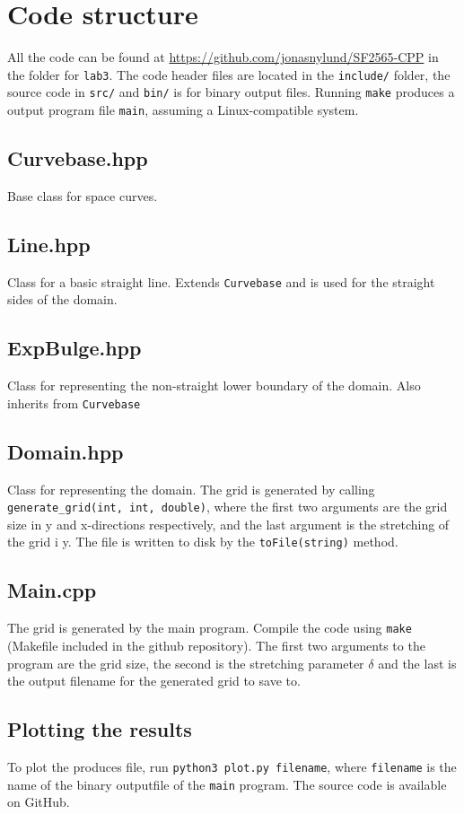 \documentclass[12pt]{article}
\begin{document}
\section{Code structure}
All the code can be found at \href{https://github.com/jonasnylund/SF2565-CPP}{https://github.com/jonasnylund/SF2565-CPP} in the folder for \texttt{lab3}. The code header files are located in the \texttt{include/} folder, the source code in \texttt{src/} and \texttt{bin/} is for binary output files. Running \texttt{make} produces a output program file \texttt{main}, assuming a Linux-compatible system.

\subsection*{Curvebase.hpp}
Base class for space curves.



\subsection*{Line.hpp}
Class for a basic straight line. Extends \texttt{Curvebase} and is used for the straight sides of the domain.



\subsection*{ExpBulge.hpp}
Class for representing the non-straight lower boundary of the domain. Also inherits from \texttt{Curvebase}


\subsection*{Domain.hpp}
Class for representing the domain. The grid is generated by calling \texttt{generate\_grid(int, int, double)}, where the first two arguments are the grid size in y and x-directions respectively, and the last argument is the stretching of the grid i y. The file is written to disk by the \texttt{toFile(string)} method.


\subsection*{Main.cpp}
The grid is generated by the main program. Compile the code using \texttt{make} (Makefile included in the github repository). The first two arguments to the program are the grid size, the second is the stretching parameter $\delta$ and the last is the output filename for the generated grid to save to. 



\subsection*{Plotting the results}
To plot the produces file, run \texttt{python3 plot.py filename}, where \texttt{filename} is the name of the binary outputfile of the \texttt{main} program.
The source code is available on GitHub.
\end{document}
